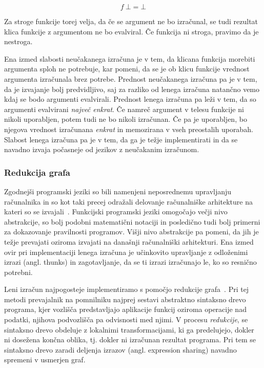 $$ f \: \bot = \bot $$

Za stroge funkcije torej velja, da če se argument ne bo izračunal, se tudi rezultat klica funkcije z argumentom ne bo evalviral. Če funkcija ni stroga, pravimo da je nestroga.


Ena izmed slabosti neučakanega izračuna je v tem, da klicana funkcija morebiti argumenta sploh ne potrebuje, kar pomeni, da se je ob klicu funkcije vrednost argumenta izračunala brez potrebe. Prednost neučakanega izračuna pa je v tem, da je izvajanje bolj predvidljivo, saj za razliko od lenega izračuna natančno vemo kdaj se bodo argumenti evalvirali. Prednost lenega izračuna pa leži v tem, da so argumenti evalvirani \textit{največ enkrat}. Če namreč argument v telesu funkcije ni nikoli uporabljen, potem tudi ne bo nikoli izračunan. Če pa je uporabljen, bo njegova vrednost izračunana \textit{enkrat} in memozirana v vseh preostalih uporabah. Slabost lenega izračuna pa je v tem, da ga je težje implementirati in da se navadno izvaja počasneje od jezikov z neučakanim izračunom.


\subsubsection{Redukcija grafa}

Zgodnejši programski jeziki so bili namenjeni neposrednemu upravljanju ra\-ču\-nal\-ni\-ka in so kot taki precej odražali delovanje računalniške arhitekture na kateri so se izvajali~\cite{10.1145/72551.72554}. Funkcijski programski jeziki omogočajo večji nivo abstrakcije, so bolj podobni matematični notaciji in posledično tudi bolj primerni za dokazovanje pravilnosti programov. Višji nivo abstrakcije pa pomeni, da jih je težje prevajati oziroma izvajati na današnji računalniški arhitekturi. Ena izmed ovir pri implementaciji lenega izračuna je učinkovito upravljanje z odloženimi izrazi (angl. thunks) in zagotavljanje, da se ti izrazi izračunajo le, ko so resnično potrebni.

Leni izračun najpogosteje implementiramo s pomočjo redukcije gra\-fa~\cite{peyton1987implementation, 10.1145/72551.72554}. Pri tej metodi prevajalnik na pomnilniku najprej sestavi abstraktno sintaksno drevo programa, kjer vozlišča predstavljajo aplikacije funkcij oziroma operacije nad podatki, njihova podvozlišča pa odvisnosti med njimi. V procesu \textit{redukcije}, se sintaksno drevo obdeluje z lokalnimi transformacijami, ki ga predelujejo, dokler ni dosežena končna oblika, tj. dokler ni izračunan rezultat programa. Pri tem se sintaksno drevo zaradi deljenja izrazov (angl. expression sharing) navadno spremeni v usmerjen graf.

